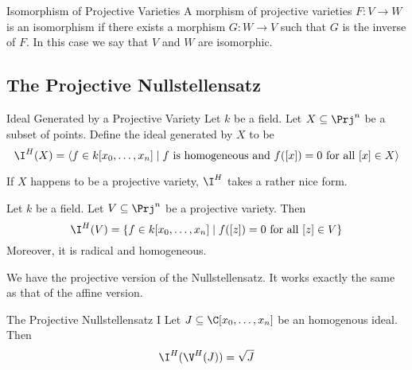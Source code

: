 \documentclass[a4paper]{article}
\begin{document}
\begin{defn}{Isomorphism of Projective Varieties}{} A morphism of projective varieties $F:V\to W$ is an isomorphism if there exists a morphism $G:W\to V$ such that $G$ is the inverse of $F$. In this case we say that $V$ and $W$ are isomorphic. 
\end{defn}

\subsection{The Projective Nullstellensatz}
\begin{defn}{Ideal Generated by a Projective Variety}{} Let $k$ be a field. Let $X\subseteq\Prj^n$ be a subset of points. Define the ideal generated by $X$ to be $$\I^H(X)=\langle f\in k[x_0,\dots,x_n]\;|\;f\text{ is homogeneous and }f([x])=0\text{ for all }[x]\in X\rangle$$
\end{defn}

If $X$ happens to be a projective variety, $\I^H$ takes a rather nice form. 

\begin{lmm}{}{} Let $k$ be a field. Let $V\subseteq\Prj^n$ be a projective variety. Then $$\I^H(V)=\{f\in k[x_0,\dots,x_n]\;|\;f([z])=0\text{ for all }[z]\in V\}$$ Moreover, it is radical and homogeneous. 
\end{lmm}

We have the projective version of the Nullstellensatz. It works exactly the same as that of the affine version. 

\begin{thm}{The Projective Nullstellensatz I}{} Let $J\subseteq\C[x_0,\dots,x_n]$ be an homogenous ideal. Then $$\I^H(\V^H(J))=\sqrt{J}$$
\end{thm}
\end{document}
